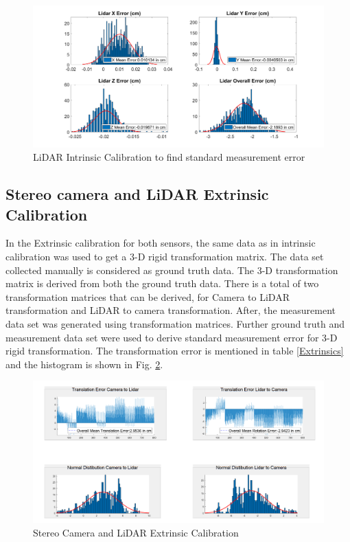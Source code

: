 \begin{figure}
    \centering
    \includegraphics[scale= 0.3]{Images/Lidar_Intrinsic.png}
    \caption{LiDAR Intrinsic Calibration to find standard measurement error}
    \label{lidarintrinsic}
\end{figure}

\subsection{Stereo camera and LiDAR Extrinsic Calibration}
In the Extrinsic calibration for both sensors, the same data as in intrinsic calibration was used to get a 3-D rigid transformation matrix. The data set collected manually is considered as ground truth data. The 3-D transformation matrix is derived from both the ground truth data. There is a total of two transformation matrices that can be derived, for Camera to LiDAR transformation and LiDAR to camera transformation. After, the measurement data set was generated using transformation matrices. Further ground truth and measurement data set were used to derive standard measurement error for 3-D rigid transformation. The transformation error is mentioned in table \ref{Extrinsics} and the histogram is shown in Fig. \ref{lExtrinsic}.        

\begin{figure}
    \centering
    \includegraphics[scale= 0.27]{Images/Extrinsic_Calibration.png}
    \caption{Stereo Camera and LiDAR Extrinsic Calibration}
    \label{lExtrinsic}
\end{figure}

